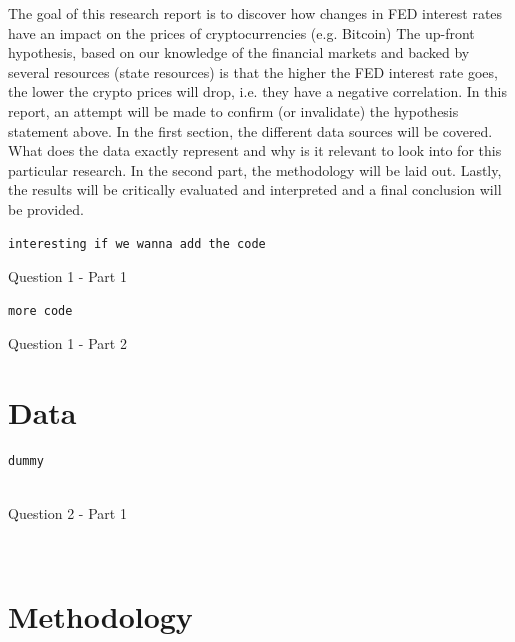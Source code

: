 \documentclass[12pt]{article}
\begin{document}
The goal of this research report is to discover how changes in FED interest rates have an impact on the prices of cryptocurrencies (e.g. Bitcoin) \newline
The up-front hypothesis, based on our knowledge of the financial markets and backed by several resources (state resources) is that the higher the FED interest rate goes, the lower the crypto prices will drop, i.e. they have a negative correlation. In this report, an attempt will be made to  confirm (or invalidate) the hypothesis statement above. \newline
In the first section, the different data sources will be covered. What does the data exactly represent and why is it relevant to look into for this particular research. In the second part, the methodology will be laid out. Lastly, the results will be critically evaluated and interpreted and a final conclusion will be provided. 


\begin{Program}[!htb]
\begin{lstlisting}[style=Matlab-editor,basicstyle=\mlttfamily\footnotesize]
interesting if we wanna add the code 
\end{lstlisting}
\caption{Question 1 - Part 1}
\label{Question 1 - Part 1}
\end{Program}

\begin{Program}[!htb]
\begin{lstlisting}[style=Matlab-editor,basicstyle=\mlttfamily\footnotesize]
more code 
\end{lstlisting}
\caption{Question 1 - Part 2}
\label{Question 1 - Part 2}
\end{Program}


\section{Data}

\begin{Program}[!htb]
\begin{lstlisting}[style=Matlab-editor,basicstyle=\mlttfamily\footnotesize]
dummy
  
\end{lstlisting}
\caption{Question 2 - Part 1}
\label{Question 2 - Part 1}
\end{Program}


 




\



\newpage
\section{Methodology}
\end{document}
